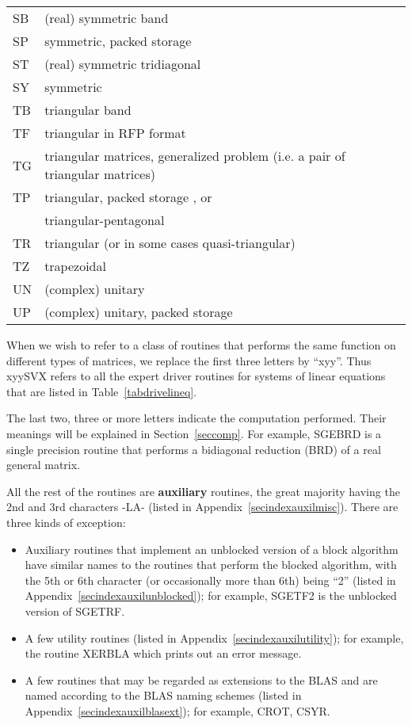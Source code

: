 \begin{table}[h]
\begin{center}
\begin{tabular} { l l }
SB  &  (real) symmetric band \\
SP  &  symmetric, packed storage \\
ST  &  (real) symmetric tridiagonal \\
SY  &  symmetric \\
TB  &  triangular band \\
TF  &  triangular in RFP format \\
TG  &  triangular matrices, generalized problem (i.e. a pair of triangular matrices) \\
TP  &  triangular, packed storage , or\\
      &  triangular-pentagonal \\
TR  &  triangular (or in some cases quasi-triangular)\\
TZ  &  trapezoidal \\
UN  &  (complex) unitary \\
UP  &  (complex) unitary, packed storage \\
\end{tabular}
\end{center}
\end{table}

When we wish to refer to a class of routines that performs the
same function on different types of matrices, we replace the first three
letters by ``xyy''. Thus xyySVX refers to all the expert driver routines for
systems of linear equations that are listed in Table~\ref{tabdrivelineq}.

The last two, three or more letters indicate the computation performed.
Their meanings will be explained in Section~\ref{seccomp}.
For example, SGEBRD is a single precision routine that performs a
bidiagonal reduction (BRD) of a real general matrix.

All the rest of the routines are {\bf auxiliary} routines, the great majority having the
2nd and 3rd characters -LA- (listed in Appendix~\ref{secindexauxilmisc}).
There are three kinds of exception:

\begin{itemize}

\item Auxiliary routines that implement an unblocked version of a block
algorithm have similar names to the routines that perform
the blocked algorithm, with the 5th or 6th character (or occasionally more than 6th) being ``2''
(listed in Appendix~\ref{secindexauxilunblocked}); for example, 
SGETF2 is the unblocked version of SGETRF.

\item A few utility routines (listed in Appendix~\ref{secindexauxilutility}); 
for example, the routine XERBLA which prints out an error message.

\item A few routines that may be
regarded as extensions to the BLAS and are named according to the BLAS
naming schemes (listed in Appendix~\ref{secindexauxilblasext}); for example, 
CROT, CSYR.

\end{itemize}


